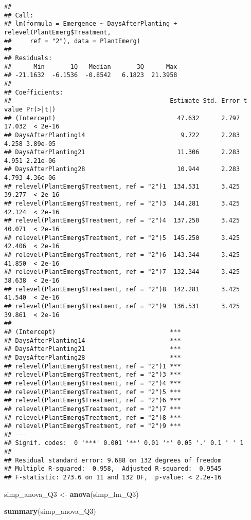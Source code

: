 \documentclass[
  12pt,
]{article}
\newenvironment{Shaded}{\begin{snugshade}}{\end{snugshade}}
\newcommand{\FunctionTok}[1]{\textcolor[rgb]{0.13,0.29,0.53}{\textbf{#1}}}
\newcommand{\NormalTok}[1]{#1}
\newcommand{\OtherTok}[1]{\textcolor[rgb]{0.56,0.35,0.01}{#1}}
\begin{document}
\begin{verbatim}
## 
## Call:
## lm(formula = Emergence ~ DaysAfterPlanting + relevel(PlantEmerg$Treatment, 
##     ref = "2"), data = PlantEmerg)
## 
## Residuals:
##      Min       1Q   Median       3Q      Max 
## -21.1632  -6.1536  -0.8542   6.1823  21.3958 
## 
## Coefficients:
##                                           Estimate Std. Error t value Pr(>|t|)
## (Intercept)                                 47.632      2.797  17.032  < 2e-16
## DaysAfterPlanting14                          9.722      2.283   4.258 3.89e-05
## DaysAfterPlanting21                         11.306      2.283   4.951 2.21e-06
## DaysAfterPlanting28                         10.944      2.283   4.793 4.36e-06
## relevel(PlantEmerg$Treatment, ref = "2")1  134.531      3.425  39.277  < 2e-16
## relevel(PlantEmerg$Treatment, ref = "2")3  144.281      3.425  42.124  < 2e-16
## relevel(PlantEmerg$Treatment, ref = "2")4  137.250      3.425  40.071  < 2e-16
## relevel(PlantEmerg$Treatment, ref = "2")5  145.250      3.425  42.406  < 2e-16
## relevel(PlantEmerg$Treatment, ref = "2")6  143.344      3.425  41.850  < 2e-16
## relevel(PlantEmerg$Treatment, ref = "2")7  132.344      3.425  38.638  < 2e-16
## relevel(PlantEmerg$Treatment, ref = "2")8  142.281      3.425  41.540  < 2e-16
## relevel(PlantEmerg$Treatment, ref = "2")9  136.531      3.425  39.861  < 2e-16
##                                              
## (Intercept)                               ***
## DaysAfterPlanting14                       ***
## DaysAfterPlanting21                       ***
## DaysAfterPlanting28                       ***
## relevel(PlantEmerg$Treatment, ref = "2")1 ***
## relevel(PlantEmerg$Treatment, ref = "2")3 ***
## relevel(PlantEmerg$Treatment, ref = "2")4 ***
## relevel(PlantEmerg$Treatment, ref = "2")5 ***
## relevel(PlantEmerg$Treatment, ref = "2")6 ***
## relevel(PlantEmerg$Treatment, ref = "2")7 ***
## relevel(PlantEmerg$Treatment, ref = "2")8 ***
## relevel(PlantEmerg$Treatment, ref = "2")9 ***
## ---
## Signif. codes:  0 '***' 0.001 '**' 0.01 '*' 0.05 '.' 0.1 ' ' 1
## 
## Residual standard error: 9.688 on 132 degrees of freedom
## Multiple R-squared:  0.958,  Adjusted R-squared:  0.9545 
## F-statistic: 273.6 on 11 and 132 DF,  p-value: < 2.2e-16
\end{verbatim}

\begin{Shaded}
\begin{Highlighting}[]
\NormalTok{simp\_anova\_Q3 }\OtherTok{\textless{}{-}} \FunctionTok{anova}\NormalTok{(simp\_lm\_Q3)}

\FunctionTok{summary}\NormalTok{(simp\_anova\_Q3)}
\end{Highlighting}
\end{Shaded}
\end{document}
